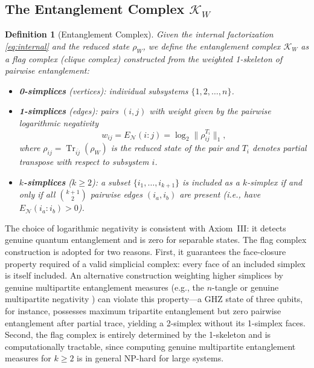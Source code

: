 \documentclass[12pt, a4paper]{article}
\newtheorem{definition}{Definition}
\begin{document}
\subsection{The Entanglement Complex $\mathcal{K}_W$}

\begin{definition}[Entanglement Complex]
\label{def:KW}
Given the internal factorization \eqref{eq:internal} and the reduced state $\rho_W$, we define the \emph{entanglement complex} $\mathcal{K}_W$ as a \emph{flag complex} (clique complex) constructed from the weighted 1-skeleton of pairwise entanglement:
\begin{itemize}
    \item \textbf{0-simplices} (vertices): individual subsystems $\{1, 2, \ldots, n\}$.
    \item \textbf{1-simplices} (edges): pairs $(i,j)$ with weight given by the pairwise logarithmic negativity
    \begin{equation}
    w_{ij} = E_{\mathcal{N}}(i{:}j) = \log_2 \lVert \rho_{ij}^{T_i} \rVert_1,
    \label{eq:negativity}
    \end{equation}
    where $\rho_{ij} = \operatorname{Tr}_{\overline{ij}}(\rho_W)$ is the reduced state of the pair and $T_i$ denotes partial transpose with respect to subsystem $i$.
    \item \textbf{$k$-simplices} ($k \geq 2$): a subset $\{i_1, \ldots, i_{k+1}\}$ is included as a $k$-simplex if and only if \emph{all} $\binom{k+1}{2}$ pairwise edges $(i_a, i_b)$ are present (i.e., have $E_{\mathcal{N}}(i_a{:}i_b) > 0$).
\end{itemize}
\end{definition}

The choice of logarithmic negativity is consistent with Axiom~III: it detects genuine quantum entanglement and is zero for separable states. The flag complex construction is adopted for two reasons. First, it guarantees the face-closure property required of a valid simplicial complex: every face of an included simplex is itself included. An alternative construction weighting higher simplices by genuine multipartite entanglement measures (e.g., the $n$-tangle \cite{Coffman2000} or genuine multipartite negativity \cite{Jungnitsch2011}) can violate this property---a GHZ state of three qubits, for instance, possesses maximum tripartite entanglement but zero pairwise entanglement after partial trace, yielding a 2-simplex without its 1-simplex faces. Second, the flag complex is entirely determined by the 1-skeleton and is computationally tractable, since computing genuine multipartite entanglement measures for $k \geq 2$ is in general NP-hard for large systems.
\end{document}
